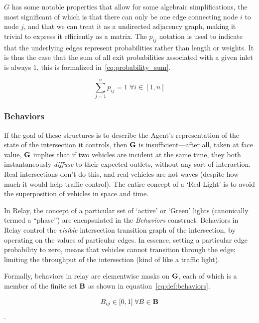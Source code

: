\documentclass{report}
\begin{document}
$G$ has some notable properties that allow for some algebraic simplifications, the most significant of which is that there can only be one edge connecting node $i$ to node $j$, and that we can treat it as a undirected adjacency graph, making it trivial to express it efficiently as a matrix.
The $p_{ij}$ notation is used to indicate that the underlying edges represent probabilities rather than length or weights.
It is thus the case that the sum of all exit probabilities associated with a given inlet is always 1, this is formalized in~\eqref{eq:probability_sum}.

\begin{equation}\label{eq:probability_sum}
	\sum_{j=1}^n p_{ij} = 1 \; \forall i \in \left[1, n\right]
\end{equation}


\subsubsection{Behaviors}
\label{sec:def:behaviors}

If the goal of these structures is to describe the Agent's representation of the state of the intersection it controls, then $\bf{G}$ is insufficient---after all, taken at face value, $\bf{G}$ implies that if two vehicles are incident at the same time, they both instantaneously \emph{diffuse} to their expected outlets, without any sort of interaction.
Real intersections don't do this, and real vehicles are not waves (despite how much it would help traffic control).
The entire concept of a `Red Light' is to avoid the superposition of vehicles in space and time.

In Relay, the concept of a particular set of `active' or `Green' lights (canonically termed a ``phase'') are encapsulated in the \emph{Behaviors} construct.
Behaviors in Relay control the \emph{visible} intersection transition graph of the intersection, by operating on the values of particular edges.
In essence, setting a particular edge probability to zero, means that vehicles cannot transition through the edge; limiting the throughput of the intersection (kind of like a traffic light).

Formally, behaviors in relay are elementwise masks on $\bf{G}$, each of which is a member of the finite set $\bf{B}$ as shown in equation~\eqref{eq:def:behaviors}.

\begin{equation}\label{eq:def:behaviors}
	B_{ij} \in [0, 1] \; \forall B \in \bf{B}
\end{equation}.
\end{document}
